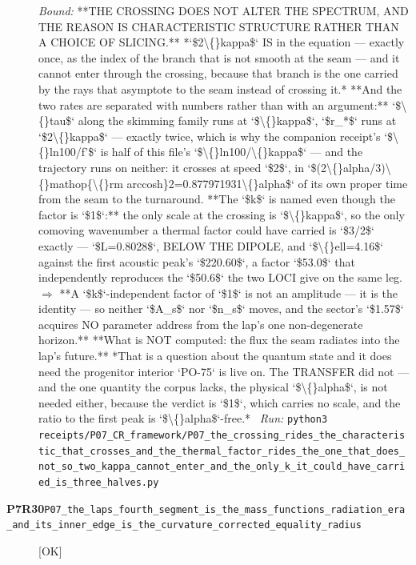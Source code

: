 \begin{description}
 \emph{Bound:}  **THE CROSSING DOES NOT ALTER THE SPECTRUM, AND THE REASON IS CHARACTERISTIC STRUCTURE RATHER THAN A CHOICE OF SLICING.** *`\$2\textbackslash\{\}kappa\$` IS in the equation --- exactly once, as the index of the branch that is not smooth at the seam --- and it cannot enter through the crossing, because that branch is the one carried by the rays that asymptote to the seam instead of crossing it.*  **And the two rates are separated with numbers rather than with an argument:** `\$\textbackslash\{\}tau\$` along the skimming family runs at `\$\textbackslash\{\}kappa\$`, `\$r\_*\$` runs at `\$2\textbackslash\{\}kappa\$` --- exactly twice, which is why the companion receipt's `\$\textbackslash\{\}ln100/\textbar{}f'\textbar{}\$` is half of this file's `\$\textbackslash\{\}ln100/\textbackslash\{\}kappa\$` --- and the trajectory runs on neither: it crosses at speed `\$2\$`, in `\$(2\textbackslash\{\}alpha/3)\textbackslash\{\}mathop\{\textbackslash\{\}rm arccosh\}2=0.877971931\textbackslash\{\}alpha\$` of its own proper time from the seam to the turnaround.  **The `\$k\$` is named even though the factor is `\$1\$`:** the only scale at the crossing is `\$\textbackslash\{\}kappa\$`, so the only comoving wavenumber a thermal factor could have carried is `\$3/2\$` exactly --- `\$L=0.8028\$`, BELOW THE DIPOLE, and `\$\textbackslash\{\}ell=4.16\$` against the first acoustic peak's `\$220.60\$`, a factor `\$53.0\$` that independently reproduces the `\$50.6\$` the two LOCI give on the same leg. \ensuremath{\Rightarrow} **A `\$k\$`-independent factor of `\$1\$` is not an amplitude --- it is the identity --- so neither `\$A\_s\$` nor `\$n\_s\$` moves, and the sector's `\$1.57\$` acquires NO parameter address from the lap's one non-degenerate horizon.**  **What is NOT computed: the flux the seam radiates into the lap's future.** *That is a question about the quantum state and it does need the progenitor interior `PO-75` is live on. The TRANSFER did not --- and the one quantity the corpus lacks, the physical `\$\textbackslash\{\}alpha\$`, is not needed either, because the verdict is `\$1\$`, which carries no scale, and the ratio to the first peak is `\$\textbackslash\{\}alpha\$`-free.*
\ \emph{Run:} \texttt{python3 receipts/P07\_CR\_framework/P07\_the\_crossing\_rides\_the\_characteristic\_that\_crosses\_and\_the\_thermal\_factor\_rides\_the\_one\_that\_does\_not\_so\_two\_kappa\_cannot\_enter\_and\_the\_only\_k\_it\_could\_have\_carried\_is\_three\_halves.py}
\item[\rcptlabel{P07_the_laps_fourth_segment_is_the_mass_functions_radiation_era_and_its_inner_edge_is_the_curvature_corrected_equality_radius}{P7R30}\textbf{P7R30}\quad\texttt{P07\_the\_laps\_fourth\_segment\_is\_the\_mass\_functions\_radiation\_era\_and\_its\_inner\_edge\_is\_the\_curvature\_corrected\_equality\_radius}]\hfill\textsf{[OK]}\\

\end{description}
